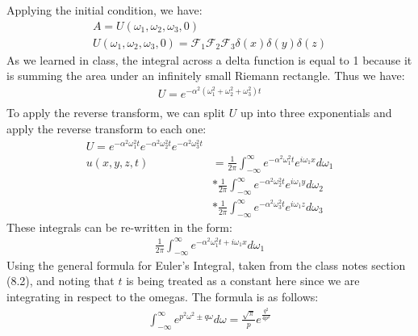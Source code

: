 \documentclass{article}
\begin{document}
Applying the initial condition, we have:
\begin{equation}
\begin{aligned}
A = U(\omega_1, \omega_2, \omega_3, 0)\\
U(\omega_1, \omega_2, \omega_3, 0) = \mathcal{F}_1\mathcal{F}_2\mathcal{F}_3\delta (x)\delta (y) \delta(z)
\end{aligned}
\end{equation}
As we learned in class, the integral across a delta function is equal to 1 because it is summing the area under an infinitely small Riemann rectangle. Thus we have:
\begin{equation}
\begin{aligned}
U = e^{-\alpha^2(\omega_1^2 + \omega_2^2 + \omega_3^2)t}\\
\end{aligned}
\end{equation}
To apply the reverse transform, we can split $U$ up into three exponentials and apply the reverse transform to each one:
\begin{equation}
\begin{aligned}
U = e^{-\alpha^2\omega_1^2t}e^{-\alpha^2\omega_2^2t} e^{-\alpha^2\omega_3^2t}\\
u(x,y,z,t) &= \frac{1}{2\pi}\int_{-\infty}^{\infty}e^{-\alpha^2\omega_1^2t}e^{i\omega_1 x}d\omega_1\\
&*\frac{1}{2\pi}\int_{-\infty}^{\infty}e^{-\alpha^2\omega_2^2t}e^{i\omega_1 y}d\omega_2\\
&*\frac{1}{2\pi}\int_{-\infty}^{\infty}e^{-\alpha^2\omega_3^2t}e^{i\omega_1 z}d\omega_3
\end{aligned}
\end{equation}
These integrals can be re-written in the form:
\begin{equation}
\begin{aligned}
\frac{1}{2\pi}\int_{-\infty}^{\infty}e^{-\alpha^2\omega_1^2t + i\omega_1 x}d\omega_1
\end{aligned}
\end{equation}
Using the general formula for Euler's Integral, taken from the class notes section (8.2), and noting that $t$ is being treated as a constant here since we are integrating in respect to the omegas. The formula is as follows:
\begin{equation}
\begin{aligned}
\int_{-\infty}^{\infty}e^{p^2\omega^2 \pm q\omega}d\omega = \frac{\sqrt{\pi}}{p}e^{\frac{q^2}{4p^2}}
\end{aligned}
\end{equation}
\end{document}
